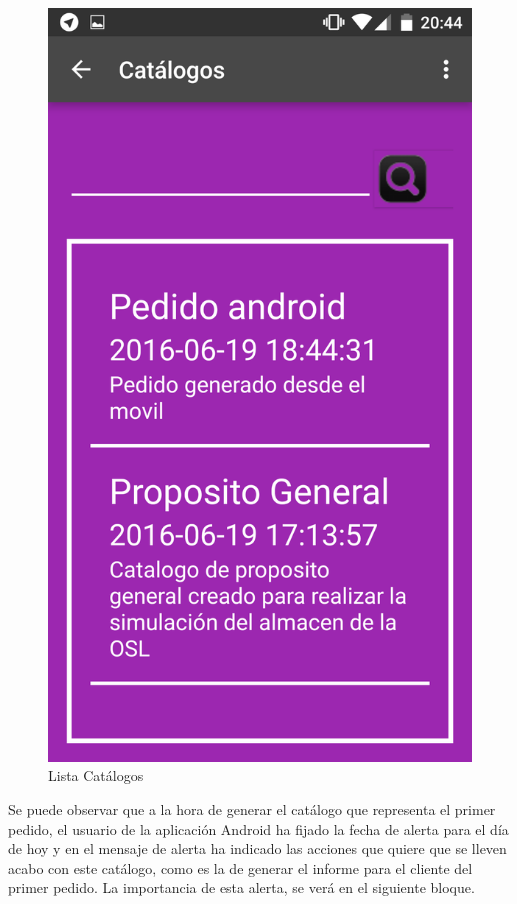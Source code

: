 \documentclass[a4paper,11pt]{book}
\begin{document}
\begin{figure}[H]
  \includegraphics[width=\linewidth]{imagenes/pruebas/movil/movil12.png}
  \caption{Lista Catálogos\cite{propio}}
\endminipage\hfill
\end{figure}

Se puede observar que a la hora de generar el catálogo que representa el primer pedido, el usuario de la aplicación Android ha fijado la fecha de alerta para el día de hoy y en el mensaje de alerta ha indicado las acciones que quiere que se lleven acabo con este catálogo, como es la de generar el informe para el cliente del primer pedido. La importancia de esta alerta, se verá en el siguiente bloque. 
\end{document}
